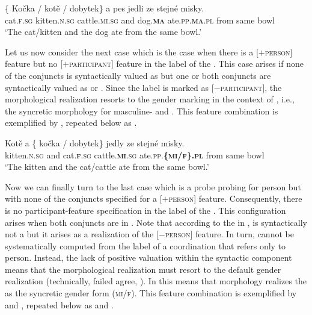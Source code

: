 \documentclass[output=paper,modfontsnewtxmath,hidelinks]{langscibook}
\begin{document}
\ea\gll \{\hspace{-2pt} Kočka / kotě / dobytek\} a pes jedli ze stejné misky.\label{baseline-anim-rep}\\
{} cat.\textsc{f.sg} {} kitten.\textsc{n.sg} {} cattle.\textsc{mi.sg} and dog.\textsc{\textbf{ma}} ate.\textsc{pp.\textbf{ma}.pl} from same bowl\\
\glt `The cat/kitten and the dog ate from the same bowl.'\\\hfill {}
\z

\noindent Let us now consider the next case which is the case when there is a [$+$\textsc{person}] feature but no [$+$\textsc{participant}] feature in the label of the . This case arises if none of the conjuncts is syntactically valued as   but one or both conjuncts are syntactically valued as   or . Since the label is marked as [$-$\textsc{participant}], the morphological realization resorts to the gender marking in the context of , i.e., the syncretic morphology for masculine-  and  . This feature combination is exemplified by , repeated below as .

\ea\gll Kotě a \{\hspace{-2pt} kočka / dobytek\} jedly ze stejné misky.\label{baseline-inanim-rep}\\
kitten.\textsc{n.sg} and {} cat.\textsc{\textbf{f}.sg} {} cattle.\textsc{\textbf{mi}.sg} ate.\textsc{pp.\textbf{\{mi/f\}.pl}} from same bowl\\
\glt `The kitten and the cat/cattle ate from the same bowl.'\\\hfill{}
\z

\noindent Now we can finally turn to the last case which is a probe probing for person but with none of the conjuncts specified for a [$+$\textsc{person}] feature. Consequently, there is no participant-feature specification in the label of the . This configuration arises when both conjuncts are in . Note that according to the  in ,  is syntactically not a  but it arises as a realization of the [$-$\textsc{person}] feature.  In turn,   cannot be systematically computed from the label of a coordination that refers only to person. Instead, the lack of positive valuation  within the syntactic component means that the morphological realization must resort to the default gender realization (technically, failed agree, \citealt{Preminger2009}). In  this means that  morphology realizes the  as the syncretic  gender form (\textsc{mi/f}). This feature combination is exemplified by  and , repeated below as  and .
\end{document}
